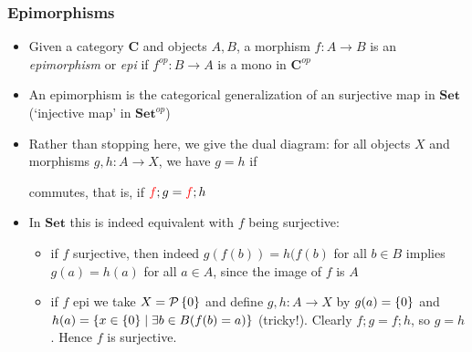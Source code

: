 \documentclass[handout]{beamer}
\newcommand{\bfsf}[1]{{\boldsymbol{#1}}}
\newcommand{\Set}{\bfsf{Set}}
\newcommand{\CC}{\bfsf{C}}
\begin{document}
\frame
  {   
    \frametitle{Epimorphisms}\label{Ch4:Epis}

 \begin{itemize}[<+->]
\item Given a category $\CC$ and objects $A,B$, a morphism $f: A\to B$ is an
\emph{epimorphism} or \emph{epi} if $f^{op}: B\to A$ is a mono in $\CC^{op}$
\item An epimorphism is the categorical generalization of an surjective map in $\Set$
({\color{red}`injective map' in $\Set^{op}$})
\item Rather than stopping here, we give the dual diagram:
for all objects $X$ and morphisms $g,h: A\to X$, we have $g=h$ if  
 commutes, that is, if ${\color{red}f};g={\color{red}f};h$   %
\item In $\Set$ this is indeed equivalent with $f$ being surjective:
 \begin{itemize}
    \item if $f$ surjective, then indeed $g(f(b))=h(f(b)$ for all $b\in B$
      implies $g(a)=h(a)$ for all $a\in A$, since the image of $f$ is $A$
    \item if $f$ epi we take $X=\operatorname{\mathcal{P}}{\{0\}}$ and define $g,h: A\to X$ by $g(a)=\{0\}$
and {\color{red}$h(a)=\{ x\in\{0\}\mid \exists b\in B (f(b)=a)\}$ (tricky!).}
Clearly $f;g=f;h$, so $g=h$. Hence $f$ is surjective.
\end{itemize}
 \end{itemize}

 }
\end{document}
